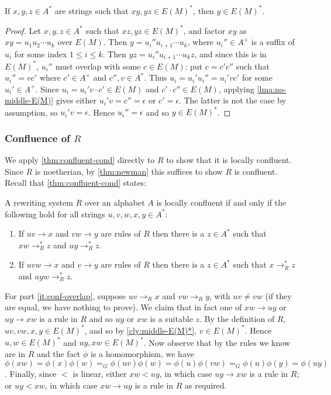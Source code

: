 \documentclass[noindex,noinsetproof,emphthm,12pt]{lmaths}
\begin{document}
\begin{cly} \label{cly:middle-E(M)*}
	If $x, y, z \in A^*$ are strings such that $xy, yz \in E(M)^*$, then $y \in E(M)^*$.
\end{cly}
\begin{proof}
	Let $x, y, z \in A^*$ such that $xz, yz \in E(M)^*$, and factor $xy$ as $xy = u_1u_2 \cdots u_k$ over $E(M)$. Then $y = u_i''u_{i+1}\cdots u_k$, where $u_i'' \in A^+$ is a suffix of $u_i$ for some index $1 \le i \le k$. Then $yz = u_i'' u_{i+1} \cdots u_k z$, and since this is in $E(M)^*$, $u_i''$ must overlap with some $c \in E(M)$: put $c = c'c''$ such that $u_i'' = vc'$ where $c' \in A^+$ and $c'', v \in A^*$. Thus $u_i = u_i' u_i'' = u_i'vc'$ for some $u_i' \in A^+$. Since $u_i = u_i'v \cdot c' \in E(M)$ and $c' \cdot c'' \in E(M)$, applying \cref{lma:no-middle-E(M)} gives either $u_i'v = c'' = \epsilon$ or $c' = \epsilon$. The latter is not the case by assumption, so $u_i'v = \epsilon$. Hence $u_i'' = \epsilon$ and so $y \in E(M)^*$.
\end{proof}


\subsubsection{\texorpdfstring{Confluence of $R$}{Confluence of R}}

We apply \cref{thm:confluent-cond} directly to $R$ to show that it is locally confluent. Since $R$ is noetherian, by \cref{thm:newman} this suffices to show $R$ is confluent. Recall that \cref{thm:confluent-cond} states:

\begin{theorem*}
	A rewriting system $R$ over an alphabet $A$ is locally confluent if and only if the following hold for all strings $u, v, w, x, y \in A^*$:
	\begin{enumerate}[(1)]
		\item If $uv \to x$ and $vw \to y$ are rules of $R$ then there is a $z \in A^*$ such that $xw \to^*_R z$ and $uy \to^*_R z$.
		\item If $uvw \to x$ and $v \to y$ are rules of $R$ then there is a $z \in A^*$ such that $x \to^*_R z$ and $uyw \to^*_R z$.
	\end{enumerate}
\end{theorem*}


For part \ref{it:conf-overlap}, suppose $uv \to_R x$ and $vw \to_R y$, with $uv \ne vw$ (if they are equal, we have nothing to prove). We claim that in fact one of $xw \to uy$ or $uy \to xw$ is a rule in $R$ and so $uy$ or $xw$ is a suitable $z$. By the definition of $R$, $uv, vw, x, y\in E(M)^*$, and so by \cref{cly:middle-E(M)*}, $v \in E(M)^*$. Hence $u, w \in E(M)^*$ and $uy, xw \in E(M)^*$. Now observe that by the rules we know are in $R$ and the fact $\phi$ is a homomorphism, we have $\phi(xw) = \phi(x)\phi(w) =_G \phi(uv)\phi(w) = \phi(u)\phi(vw) =_G \phi(u)\phi(y) = \phi(uy)$. Finally, since $<$ is linear, either $xw < uy$, in which case $uy \to xw$ is a rule in $R$; or $uy < xw$, in which case $xw \to uy$ is a rule in $R$ as required.
\end{document}
